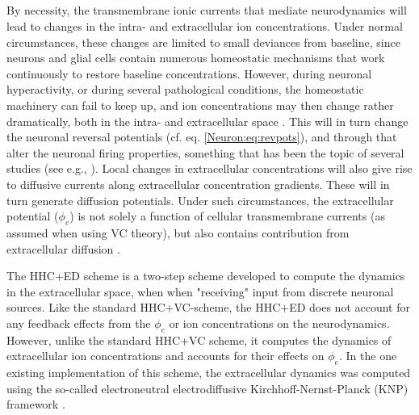 \subsection{}
\label{sec:Schemes:KNP}
By necessity, the transmembrane ionic currents that mediate neurodynamics will lead to changes in the intra- and extracellular ion concentrations. Under normal circumstances, these changes are limited to small deviances from baseline, since neurons and glial cells contain numerous homeostatic mechanisms that work continuously to restore baseline concentrations. However, during neuronal hyperactivity, or during several pathological conditions, the homeostatic machinery can fail to keep up, and ion concentrations may then change rather dramatically, both in the intra- and extracellular space \citep{Dietzel1989, Somjen2001, Frohlich2008, Zandt2015, Ayata2015}. This will in turn change the neuronal reversal potentials (cf. eq. \ref{Neuron:eq:revpots}), and through that alter the neuronal firing properties, something that has been the topic of several studies (see e.g., \citep{Qian1989, Cressman2009, Zandt2011, Oyehaug2012, WeiUllahSchiff2014, Saetra2020}). Local changes in extracellular concentrations will also give rise to diffusive currents along extracellular concentration gradients. These will in turn generate diffusion potentials. Under such circumstances, the extracellular potential ($\phi_e$) is not solely a function of cellular transmembrane currents (as assumed when using VC theory), but also contains contribution from extracellular diffusion \citep{Halnes2016}. 

The HHC+ED scheme is a two-step scheme developed to compute the dynamics in the extracellular space, when when "receiving" input from discrete neuronal sources. Like the standard HHC+VC-scheme, the HHC+ED does not account for any feedback effects from the $\phi_e$ or ion concentrations on the neurodynamics. However, unlike the standard HHC+VC scheme, it computes the dynamics of extracellular ion concentrations and accounts for their effects on $\phi_e$. In the one existing implementation of this scheme, the extracellular dynamics was computed using the so-called electroneutral  electrodiffusive  Kirchhoff-Nernst-Planck (KNP) framework \citep{Solbra2018}. 

